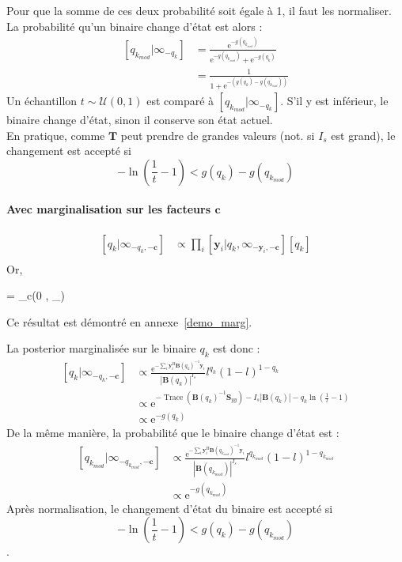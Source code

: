 \documentclass[ 12pt]{article}
\renewenvironment{equation}{\vspace{-0.2cm}\begin{oldequation}}{\vspace{-0.2cm}\end{oldequation}}
\newcommand{\e}{\mathrm{e}}
\begin{document}
Pour que la somme de ces deux probabilité soit égale à 1, il faut les normaliser. La probabilité qu'un binaire change d'état est alors : 
\begin{align*}
	\left[q_{k_{mod}} | \infty_{-q_k}  \right] & =  \frac{ \e^{- g(q_{k_{mod}})}}{ \e^{- g(q_{k_{mod}})} +\e^{- g(q_{k})}}  \\[1ex]
	&\boxed{= \frac{1}{1 + \e^{- \left(g(q_{k}) -   g(q_{k_{mod}})\right)}}}
\end{align*}
Un échantillon $t \sim \mathcal{U}(0,1)$ est comparé à $\left[q_{k_{mod}} | \infty_{-q_k}  \right]$. S'il y est inférieur, le binaire change d'état, sinon il conserve son état actuel.\\
En pratique, comme $\bm{T}$ peut prendre de grandes valeurs (not. si $I_s$ est grand), le changement est accepté si $$-\ln\left(\frac{1}{t}-1\right) < g(q_{k}) -   g(q_{k_{mod}})$$


\paragraph{Avec marginalisation sur les facteurs $\bm{c}$}

\begin{align*}
	\left[q_k | \infty	_{-q_k,-\bm{c}}  \right] &\propto \prod_i  \left[ \bm{y}_i |q_k, \infty_{-\bm{y}_i,-\bm{c}} \right] [q_k]\\
\end{align*}
Or, 
\begin{equation}
         = _c(0 , _{})
\end{equation}
Ce résultat est démontré en annexe~\ref{demo_marg}.

La posterior marginalisée sur le binaire $q_k$ est donc : 
\begin{align*}
	\left[q_k | \infty	_{-q_k,-\bm{c}}  \right] &\propto \frac{\e^{ - \sum_i  \bm{y}_i^H \bm{B}(q_k)^{-1}\bm{y}_i  }}{|\bm{B}(q_k)|^{I_s}}  l^{q_k}(1-l)^{1-q_k}\\
	& \propto \e^{-\operatorname{Trace}\left( \bm{B}(q_k)^{-1}\bm{S}_{yy}\right) - I_s|\bm{B}(q_k)| - q_k \ln\left( \frac{1}{l}-1 \right)}\\
	& \propto \e^{- g(q_k)}
\end{align*}
De la même manière, la probabilité que le binaire change d'état est : 
\begin{align*}
	\left[q_{k_{mod}} | \infty	_{-q_{k_{mod}} ,-\bm{c}}  \right] & \propto  \frac{\e^{ - \sum_i  \bm{y}_i^H \bm{B}(q_{k_{mod}})^{-1}\bm{y}_i  }}{|\bm{B}(q_{k_{mod}})|^{I_s}}  l^{q_{k_{mod}}}(1-l)^{1-q_{k_{mod}}}\\
	 & \propto \e^{- g(q_{k_{mod}})}
\end{align*}
Après normalisation, le changement d'état du binaire est accepté si $$-\ln\left(\frac{1}{t}-1\right) < g(q_{k}) -   g(q_{k_{mod}})$$.
\end{document}
